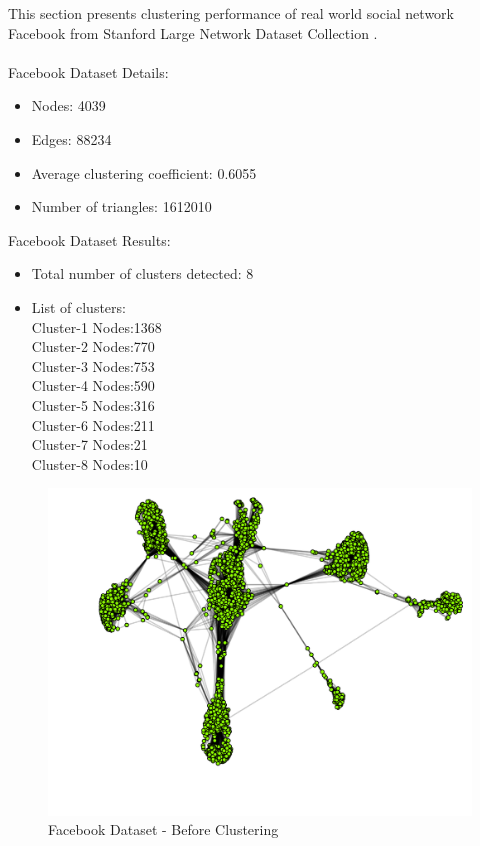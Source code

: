 This section presents clustering performance of real world social network Facebook \cite{facebookdata} from Stanford Large Network Dataset Collection \cite{snap}.\\
\\
Facebook Dataset Details:
\begin{itemize}
	\item
	Nodes: 4039
	\item
	Edges: 88234
	\item
	Average clustering coefficient:	0.6055
	\item
	Number of triangles:	1612010
\end{itemize}
\noindent
Facebook Dataset Results:
\begin{itemize}
	\item
	Total number of clusters detected: 8
	\item
	List of clusters:\\
	Cluster-1 Nodes:1368\\
	Cluster-2 Nodes:770\\
	Cluster-3 Nodes:753\\
	Cluster-4 Nodes:590\\
	Cluster-5 Nodes:316\\
	Cluster-6 Nodes:211\\
	Cluster-7 Nodes:21\\
	Cluster-8 Nodes:10\\	
\end{itemize}
\begin{figure}[H]
	\centering
	\includegraphics[scale=0.4, trim=0 0 20 0]{Images/before_facebook.pdf}
	\caption{Facebook Dataset - Before Clustering\label{fig:fb-before}}
\end{figure}
